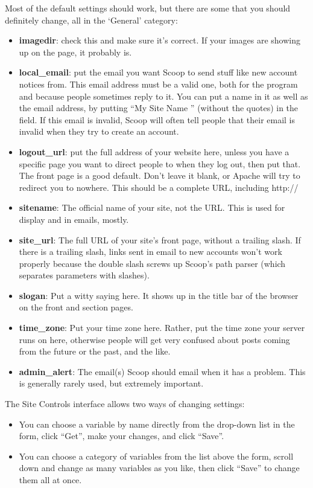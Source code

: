 Most of the default settings should work, but there are some that you should definitely change, all in the `General' category:
\begin{itemize}
\item {\bf imagedir}: check this and make sure it's correct.  If your images are showing up on the page, it probably is.
\item {\bf local\_email}: put the email you want Scoop to send stuff like new account notices from.  This email address must be a valid one, both for the program and because people sometimes reply to it.  You can put a name in it as well as the email address, by putting ``My Site Name '' (without the quotes) in the field.  If this email is invalid, Scoop will often tell people that their email is invalid when they try to create an account.
\item {\bf logout\_url}: put the full address of your website here, unless you have a specific page you want to direct people to when they log out, then put that.  The front page is a good default.  Don't leave it blank, or Apache will try to redirect you to nowhere.  This should be a complete URL, including http://
\item {\bf sitename}: The official name of your site, not the URL.  This is used for display and in emails, mostly.
\item {\bf site\_url}: The full URL of your site's front page, without a trailing slash.  If there is a trailing slash, links sent in email to new accounts won't work properly because the double slash screws up Scoop's path parser (which separates parameters with slashes).
\item {\bf slogan}: Put a witty saying here.  It shows up in the title bar of the browser on the front and section pages.
\item {\bf time\_zone}: Put your time zone here.  Rather, put the time zone your server runs on here, otherwise people will get very confused about posts coming from the future or the past, and the like.
\item {\bf admin\_alert}: The email(s) Scoop should email when it has a problem.  This is generally rarely used, but extremely important.
\end{itemize}

The Site Controls interface allows two ways of changing settings:
\begin{itemize}
\item You can choose a variable by name directly from the drop-down list in the form, click ``Get'', make your changes, and click ``Save''.  
\item You can choose a category of variables from the list above the form, scroll down and change as many variables as you like, then click ``Save'' to change them all at once.  
\end{itemize}

